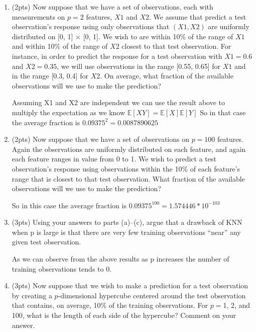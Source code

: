 \documentclass[a4paper]{article}
\theoremstyle{definition}
\newenvironment{soln}{
    \leavevmode\color{blue}\ignorespaces
}{}
\begin{document}
\begin{enumerate}
\begin{enumerate}
	
	\item (2pts) Now suppose that we have a set of observations, each with measurements on $p =2$ features, $X1$ and $X2$. We assume that predict a test observation’s response using only observations that $(X1,X2)$ are uniformly distributed on [0, 1] × [0, 1]. We wish to are within 10\% of the range of $X1$ and within 10\% of the range of $X2$ closest to that test observation. For instance, in order to predict the response for a test observation with $X1 =0.6$ and $X2 =0.35$, we will use observations in the range [0.55, 0.65] for $X1$ and in the range [0.3, 0.4] for $X2$. On average, what fraction of the available observations will we use to make the prediction?
	
	\begin{soln} Assuming X1 and X2 are independent 
            we can use the result above to multiply the expectation as we know 
            $\mathbb{E}[XY] = \mathbb{E}[X]\mathbb{E}[Y]$
            So in that case the average fraction is 
            $0.09375^2 = 0.0087890625$
 
 
 
 
        \end{soln}
	
	\item (2pts) Now suppose that we have a set of observations on $p = 100$ features. Again the observations are uniformly distributed on each feature, and again each feature ranges in value from 0 to 1. We wish to predict a test observation’s response using observations within the 10\% of each feature’s range that is closest to that test observation. What fraction of the available observations will we use to make the prediction?
	
	\begin{soln}  So in this case the average fraction is 
            $0.09375^{100} = 1.574446*10^{-103}$ \end{soln}
	
	\item (3pts) Using your answers to parts (a)–(c), argue that a drawback of KNN when p is large is that there are very few training observations “near” any given test observation.
	
	\begin{soln}  As we can observe from the above results as p increases the number of training observations tends to 0. \end{soln}
	
	\item (3pts) Now suppose that we wish to make a prediction for a test observation by creating a $p$-dimensional hypercube centered around the test observation that contains, on average, 10\% of the training observations. For $p =$1, 2, and 100, what is the length of each side of the hypercube? Comment on your answer.
	

\end{enumerate}
\end{enumerate}
\end{document}
